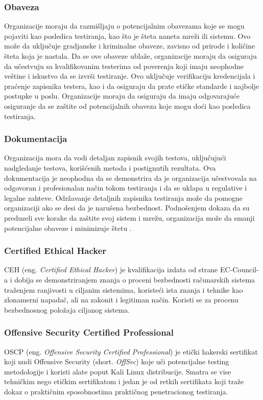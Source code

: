 \documentclass[a4paper,12pt]{article}
\begin{document}
\subsubsection*{Obaveza}
Organizacije moraju da razmišljaju o potencijalnim obavezama koje se mogu pojaviti kao posledica testiranja, kao što je šteta naneta mreži ili sistemu. Ovo može da uključuje gradjanske i kriminalne obaveze, zavisno od prirode i količine šteta koja je nastala. Da se ove obaveze ublaže, organizacije moraju da osiguraju da učestvuju sa kvalifikovanim testerima od poverenja koji imaju neophodne veštine i iskustvo da se izvrši testiranje. Ovo uključuje verifikaciju kredencijala i praćenje zapisnika testera, kao i da osiguraju da prate etičke standarde i najbolje postupke u poslu. Organizacije moraju da osiguraju da imaju odgovarajuće osiguranje da se zaštite od potencijalnih obaveza koje mogu doći kao posledica testiranja\cite{ethical-legal-pentesting}.
\subsubsection*{Dokumentacija}
Organizacija mora da vodi detaljan zapisnik svojih testova, uključujući nadgledanje testova, korišćenih metoda i postignutih rezultata. Ova dokumentacija je neophodna da se demonstrira da je organizacija učestvovala na odgovoran i profesionalan način tokom testiranja i da se uklapa u regulative i legalne zahteve. Održavanje detaljnih zapisnika testiranja može da pomogne organizaciji ako se desi da je narušena bezbednost. Podnošenjem dokaza da su preduzeli sve korake da zaštite svoj sistem i mrežu, organizacija može da smanji potencijalne obaveze i minimizuje štetu \cite{ethical-legal-pentesting}.

\subsubsection*{Certified Ethical Hacker}
CEH (eng. \textit{Certified Ethical Hacker}) je kvalifikacija izdata od strane EC-Council-a i dobija se demonstriranjem znanja o proceni bezbednosti računarskih sistema traženjem ranjivosti u ciljanim sistemima, koristeći ista znanja i tehnike kao zlonamerni napadač, ali na zakonit i legitiman način. Koristi se za procenu bezbednosnog položaja ciljanog sistema\cite{ceh}.
\subsubsection*{Offensive Security Certified Professional}
OSCP (eng. \textit{Offensive Security Certified Professional}) je etički hakerski sertifikat koji nudi Offensive Security (short. \textit{OffSec}) koje uči potencijalne testing metodologije i koristi alate poput Kali Linux distribucije. Smatra se vise tehničkim nego etičkim sertifikatom i jedan je od retkih sertifikata koji traže dokaz o praktičnim sposobnostima praktičnog penetracionog testiranja\cite{oscp}.
\end{document}
